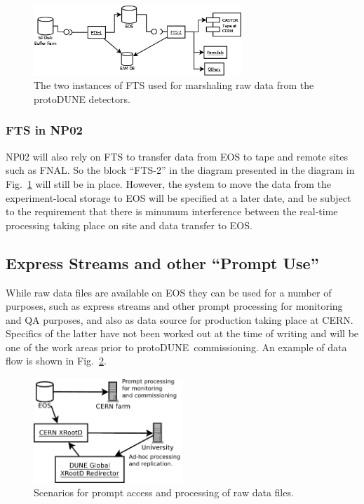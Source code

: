 \documentclass[pdftex,12pt,letter]{article}
\newcommand{\pd}{protoDUNE\ }
\begin{document}
\begin{figure}[tbh]
  \centering
  \includegraphics[width=0.7\textwidth]{ftsinstances_v2.png}
  \caption{The two instances of FTS used for marshaling raw data from the protoDUNE detectors.}
  \label{fig:ftsinstances}
\end{figure}

\subsubsection{FTS in NP02}
NP02 will also rely on FTS to transfer data from EOS to tape and remote sites such as FNAL.
So the block ``FTS-2'' in the diagram presented in the diagram in Fig.~\ref{fig:ftsinstances} will still be in place.
However, the system to move the data from the experiment-local storage to EOS will be specified at a later date,
and be subject to the requirement that there is minumum interference between the real-time processing
taking place on site and data transfer to EOS.

\subsection{Express Streams and other ``Prompt Use''}
\label{sec:prompt}

While raw data files are available on EOS they can be
used for a number of purposes, such as express streams and
other prompt processing for monitoring and QA purposes,
and also as data source for production taking place at CERN.
Specifics of the latter have not been  worked out at the time of writing
and will be one of the work areas prior to \pd commissioning.
An example of data flow is shown in Fig.~\ref{fig:prompt}.

\begin{figure}[tbh]
  \centering
  \includegraphics[width=0.5\textwidth]{prompt.pdf}
  \caption{Scenarios for prompt access and processing of raw data files.}
  \label{fig:prompt}
\end{figure}
\end{document}

